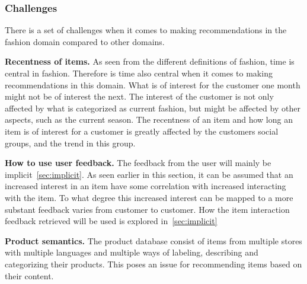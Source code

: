 \subsubsection{Challenges}
There is a set of challenges when it comes to making recommendations in the fashion domain compared to other domains.

\textbf{Recentness of items.}
As seen from the different definitions of fashion, time is central in fashion.
Therefore is time also central when it comes to making recommendations in this domain.
What is of interest for the customer one month might not be of interest the next.
The interest of the customer is not only affected by what is categorized as current fashion, but might be affected by other aspects, such as the current season.
The recentness of an item and how long an item is of interest for a customer is greatly affected by the customers social groups, and the trend in this group.

\textbf{How to use user feedback.}
The feedback from the user will mainly be implicit~\ref{sec:implicit}.
As seen earlier in this section, it can be assumed that an increased interest in an item have some correlation with increased interacting with the item.
To what degree this increased interest can be mapped to a more substant  feedback varies from customer to customer.
How the item interaction feedback retrieved will be used is explored in~\ref{sec:implicit}

\textbf{Product semantics.}
The product database consist of items from multiple stores with multiple languages and multiple ways of labeling, describing and categorizing their products.
This poses an issue for recommending items based on their content.



